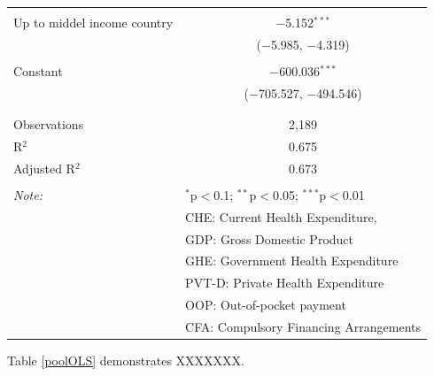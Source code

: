 \documentclass[]{elsarticle} %
\begin{document}
\begin{table}[!htbp]
\begin{tabular}{@{\extracolsep{5pt}}lc}
  & \\ 
 Up to middel income country & $-$5.152$^{***}$ \\ 
  & ($-$5.985, $-$4.319) \\ 
  & \\ 
 Constant & $-$600.036$^{***}$ \\ 
  & ($-$705.527, $-$494.546) \\ 
  & \\ 
\hline \\[-1.8ex] 
Observations & 2,189 \\ 
R$^{2}$ & 0.675 \\ 
Adjusted R$^{2}$ & 0.673 \\ 
\hline 
\hline \\[-1.8ex] 
\textit{Note:}  & \multicolumn{1}{l}{$^{*}$p$<$0.1; $^{**}$p$<$0.05; $^{***}$p$<$0.01} \\ 
 & \multicolumn{1}{l}{CHE: Current Health Expenditure,} \\ 
 & \multicolumn{1}{l}{GDP: Gross Domestic Product} \\ 
 & \multicolumn{1}{l}{GHE: Government Health Expenditure} \\ 
 & \multicolumn{1}{l}{PVT-D: Private Health Expenditure} \\ 
 & \multicolumn{1}{l}{OOP: Out-of-pocket payment} \\ 
 & \multicolumn{1}{l}{CFA: Compulsory Financing Arrangements} \\ 
\end{tabular} 
\end{table}

Table \ref{poolOLS} demonstrates XXXXXXX.
\end{document}
